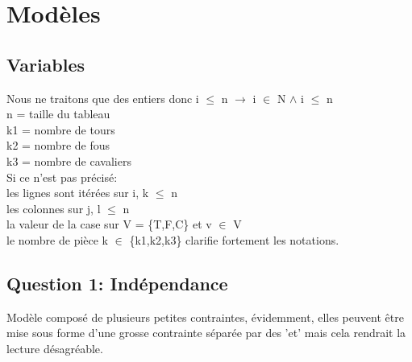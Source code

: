 \section{Modèles}


\subsection{Variables}
Nous ne traitons que des entiers donc i $\leq$ n $\longrightarrow$ i $\in$ N $\land$ i $\leq$ n \\
n = taille du tableau\\
k1 = nombre de tours\\
k2 = nombre de fous\\
k3 = nombre de cavaliers\\

Si ce n'est pas précisé: \\
les lignes sont itérées sur i, k $\leq$ n \\
les colonnes sur j, l $\leq$ n \\
la valeur de la case sur  V = \{T,F,C\} et v $\in$ V \\
le nombre de pièce k $\in$ \{k1,k2,k3\}
clarifie fortement les notations. \\



\subsection{Question 1: Indépendance}
Modèle composé de plusieurs petites contraintes, évidemment, elles peuvent être mise sous forme d'une grosse contrainte séparée par des 'et' mais cela rendrait la lecture désagréable.\\

